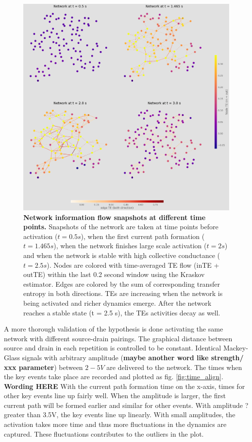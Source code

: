 \documentclass[%
 reprint,
 amsmath,amssymb,
 aps,
]{revtex4-2}
\begin{document}
\begin{figure}[h]
	\centering
	\includegraphics[width = 0.8\paperwidth]{figure/time_network_comparison}
	\caption{\textbf{Network information flow snapshots at different time points.}
			Snapshots of the network are taken at time points before activation ($t = 0.5s$), when the first current path formation ($t=1.465s$), when the network finishes large scale activation ($t = 2s$) and when the network is stable with high collective conductance ($t = 2.5s$).
			Nodes are colored with time-averaged TE flow (inTE + outTE) within the last 0.2 second window using the Kraskov estimator. Edges are colored by the sum of corresponding transfer entropy in both directions. TEs are increasing when the network is being activated and richer dynamics emerge. After the network reaches a stable state (t = 2.5 s), the TEs activities decay as well.}
	\label{fig:network_comparison}
\end{figure}

A more thorough validation of the hypothesis is done activating the same network with different source-drain pairings. The graphical distance between source and drain in each repetition is controlled to be constant. Identical Mackey-Glass signals with arbitrary amplitude (\textbf{maybe another word like strength/ xxx parameter}) between $2-5 V$ are delivered to the network. The times when the key events take place are recorded and plotted as fig. \ref{fig:time_align}. \textbf{Wording HERE} With the current path formation time on the x-axis, times for other key events line up fairly well. When the amplitude is larger, the first current path will be formed earlier and similar for other events. With amplitude ? greater than 3.5V, the key events line up linearly. With small amplitudes, the activation takes more time and thus more fluctuations in the dynamics are captured. These fluctuations contributes to the outliers in the plot.
\end{document}

